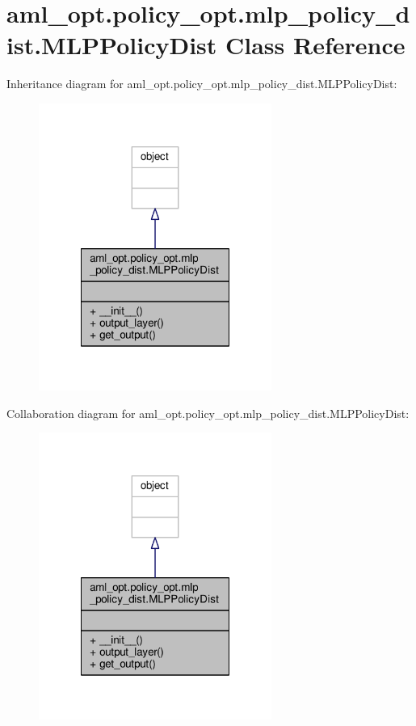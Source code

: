 \hypertarget{classaml__opt_1_1policy__opt_1_1mlp__policy__dist_1_1_m_l_p_policy_dist}{\section{aml\-\_\-opt.\-policy\-\_\-opt.\-mlp\-\_\-policy\-\_\-dist.\-M\-L\-P\-Policy\-Dist Class Reference}
\label{classaml__opt_1_1policy__opt_1_1mlp__policy__dist_1_1_m_l_p_policy_dist}
}


Inheritance diagram for aml\-\_\-opt.\-policy\-\_\-opt.\-mlp\-\_\-policy\-\_\-dist.\-M\-L\-P\-Policy\-Dist\-:
\nopagebreak
\begin{figure}[H]
\begin{center}
\leavevmode
\includegraphics[width=216pt]{classaml__opt_1_1policy__opt_1_1mlp__policy__dist_1_1_m_l_p_policy_dist__inherit__graph}
\end{center}
\end{figure}


Collaboration diagram for aml\-\_\-opt.\-policy\-\_\-opt.\-mlp\-\_\-policy\-\_\-dist.\-M\-L\-P\-Policy\-Dist\-:
\nopagebreak
\begin{figure}[H]
\begin{center}
\leavevmode
\includegraphics[width=216pt]{classaml__opt_1_1policy__opt_1_1mlp__policy__dist_1_1_m_l_p_policy_dist__coll__graph}
\end{center}
\end{figure}
